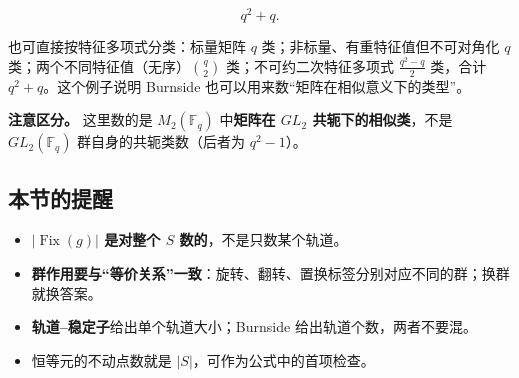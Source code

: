 \[
q^2+q.
\]

也可直接按特征多项式分类：标量矩阵 $q$ 类；非标量、有重特征值但不可对角化 $q$ 类；两个不同特征值（无序）$\binom q2$ 类；不可约二次特征多项式 $\frac{q^2-q}{2}$ 类，合计 $q^2+q$。这个例子说明 Burnside 也可以用来数“矩阵在相似意义下的类型”。

\textbf{注意区分。} 这里数的是 $M_2(\mathbb F_q)$ 中\textbf{矩阵在 $GL_2$ 共轭下的相似类}，不是 $GL_2(\mathbb F_q)$ 群自身的共轭类数（后者为 $q^2-1$）。

\subsection{本节的提醒}


\begin{itemize}
\item \textbf{$|\operatorname{Fix}(g)|$ 是对整个 $S$ 数的}，不是只数某个轨道。
\item \textbf{群作用要与“等价关系”一致}：旋转、翻转、置换标签分别对应不同的群；换群就换答案。
\item \textbf{轨道--稳定子}给出单个轨道大小；Burnside 给出轨道个数，两者不要混。
\item 恒等元的不动点数就是 $|S|$，可作为公式中的首项检查。
\end{itemize}
